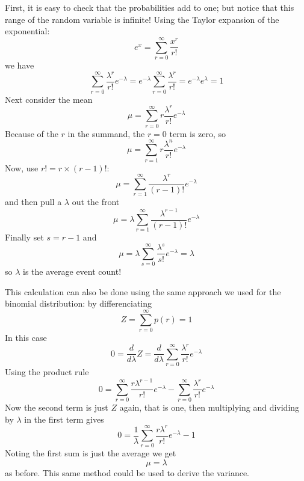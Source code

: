 \documentclass[11pt,a4paper]{scrartcl}
\begin{document}
First, it is easy to check that the probabilities add to one; but
notice that this range of the random variable is infinite!  Using the
Taylor expansion of the exponential:
\begin{equation}
e^x=\sum_{r=0}^\infty \frac{x^r}{r!}
\end{equation}
we have
\begin{equation}
\sum_{r=0}^\infty \frac{\lambda^r}{r!}e^{-\lambda}=e^{-\lambda}\sum_{r=0}^\infty \frac{\lambda^r}{r!}=e^{-\lambda}e^{\lambda}=1
\end{equation}
Next consider the mean
\begin{equation}
\mu = \sum_{r=0}^\infty r\frac{\lambda^r}{r!}e^{-\lambda}
\end{equation}
Because of the $r$ in the summand, the $r=0$ term is zero, so
\begin{equation}
\mu = \sum_{r=1}^\infty r\frac{\lambda^n}{r!}e^{-\lambda}
\end{equation}
Now, use $r!=r\times (r-1)!$:
\begin{equation}
  \mu = \sum_{r=1}^\infty \frac{\lambda^r}{(r-1)!}e^{-\lambda}
\end{equation}
and then pull a $\lambda$ out the front
\begin{equation}
\mu = \lambda \sum_{r=1}^\infty \frac{\lambda^{r-1}}{(r-1)!}e^{-\lambda}
\end{equation}
Finally set $s=r-1$ and
\begin{equation}
\mu = \lambda \sum_{s=0}^\infty \frac{\lambda^s}{s!}e^{-\lambda}=\lambda
\end{equation}
so $\lambda$ is the average event count!

This calculation can also be done using the same approach we used for the binomial distribution: by differenciating
\begin{equation}
  Z=\sum_{r=0}^\infty p(r)=1
\end{equation}
In this case
\begin{equation}
  0=\frac{d}{d\lambda}Z=\frac{d}{d\lambda}\sum_{r=0}^\infty \frac{\lambda^r}{r!}e^{-\lambda}
\end{equation}
Using the product rule
\begin{equation}
0= \sum_{r=0}^\infty \frac{r\lambda^{r-1}}{r!}e^{-\lambda}-\sum_{r=0}^\infty \frac{\lambda^r}{r!}e^{-\lambda}
\end{equation}
Now the second term is just $Z$ again, that is one, then multiplying and dividing by $\lambda$ in the first term gives
\begin{equation}
  0=\frac{1}{\lambda}\sum_{r=0}^\infty \frac{r\lambda^r}{r!}e^{-\lambda}-1
\end{equation}
Noting the first sum is just the average we get
\begin{equation}
  \mu=\lambda
\end{equation}
as before. This same method could be used to derive the variance.
\end{document}
